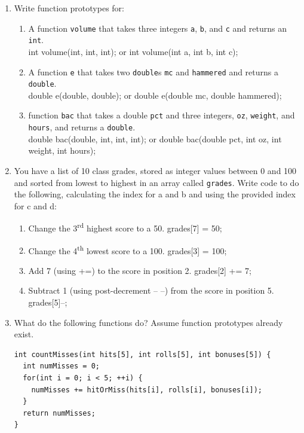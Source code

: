 \documentclass[letter,11pt]{article}
\begin{document}
\begin{enumerate}
    \item Write function prototypes for:
    \begin{enumerate}
        \item A function \texttt{volume} that takes three integers \texttt{a}, \texttt{b}, and \texttt{c} and returns an \texttt{int}. \\
        {\color{red}int volume(int, int, int);} or {\color{red}int volume(int a, int b, int c);}
        \item A function \texttt{e} that takes two \texttt{double}s \texttt{mc} and \texttt{hammered} and returns a \texttt{double}. \\
        {\color{red}double e(double, double);} or {\color{red}double e(double mc, double hammered);}
        \item function \texttt{bac} that takes a double \texttt{pct} and three integers, \texttt{oz}, \texttt{weight}, and \texttt{hours}, and returns a \texttt{double}. \\
        {\color{red}double bac(double, int, int, int);} or {\color{red}double bac(double pct, int oz, int weight, int hours);}
    \end{enumerate}
    
    \item You have a list of 10 class grades, stored as integer values between 0 and 100 and sorted from lowest to highest in an array called \texttt{grades}. Write code to do the following, calculating the index for a and b and using the provided index for c and d:
    \begin{enumerate}
        \item Change the 3\textsuperscript{rd} highest score to a 50. {\color{red}grades[7] = 50;}
        \item Change the 4\textsuperscript{th} lowest score to a 100. {\color{red}grades[3] = 100;}
        \item Add 7 (using +=) to the score in position 2. {\color{red}grades[2] += 7;}
        \item Subtract 1 (using post-decrement -- --) from the score in position 5. {\color{red}grades[5]--;}
    \end{enumerate}
    
    \item What do the following functions do? Assume function prototypes already exist.
    \begin{verbatim}
int countMisses(int hits[5], int rolls[5], int bonuses[5]) {
  int numMisses = 0;
  for(int i = 0; i < 5; ++i) {
    numMisses += hitOrMiss(hits[i], rolls[i], bonuses[i]);
  }
  return numMisses;
}


\end{verbatim}
\end{enumerate}
\end{document}
